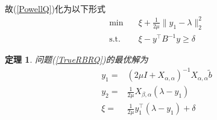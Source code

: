 \documentclass[UTF8]{ctexart}
\newtheorem{theo}{\bf 定理}[section]
\newcommand{\equSplit}[1]{\begin{equation}\begin{split}#1\end{split}\end{equation}}
\newcommand{\Tst}{\text{s.t.}\quad}
\newcommand{\norm}[1]{\lVert#1\rVert}
\numberwithin{equation}{section}
\begin{document}
			\paragraph{}
				\quad 故(\ref{PowellQ})化为以下形式
			\equSplit{\label{TrueRBRQ}
				\min \quad
					& \xi + \frac{1}{2\mu} \norm{y_1 - \lambda}^2_2\\
				\Tst
					& \xi - y^\top B^{-1} y \geq \delta
			}

			\begin{theo}
				问题(\ref{TrueRBRQ})的最优解为
				\equSplit{\label{TrueRBRA}
					y_1 = & (2 \mu I + X_{\alpha, \alpha})^{-1} X_{\alpha, \alpha}\tilde{b}\\
					y_2 = & \frac{1}{2 \mu} X_{\beta, \alpha} (\lambda - y_1)\\
					\xi = & \frac{1}{2 \mu} y_1^\top (\lambda - y_1) + \delta
				}
			\end{theo}
\end{document}
